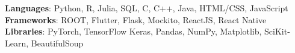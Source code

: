    \begin{itemize}[leftmargin=0.15in, label={}] 
    \small{\item{
      \textbf{Languages}: Python, R, Julia, SQL, C, C++, Java, HTML/CSS, JavaScript\\
      \textbf{Frameworks}: ROOT, Flutter, Flask, Mockito, ReactJS, React Native\\
      \textbf{Libraries}: PyTorch, TensorFlow Keras, Pandas, NumPy, Matplotlib, SciKit-Learn, BeautifulSoup
       }}
\end{itemize}